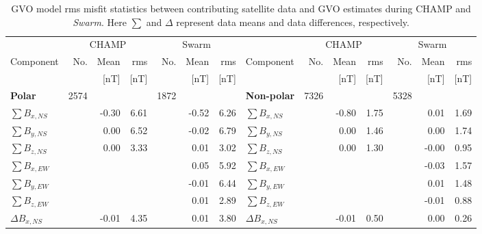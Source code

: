 \documentclass[extra,mreferee]{gji}
\begin{document}
\begin{table}
\caption{GVO model rms misfit statistics between contributing satellite data and GVO estimates  during CHAMP and \textit{Swarm}. Here {\scriptsize $\sum$} and $\Delta$ represent data means and data differences, respectively.}
\centering
{\small
\begin{tabular}{l r r r r r r | l r r r r r r}
\toprule
           & \multicolumn{3}{c}{CHAMP}  & \multicolumn{3}{c|}{Swarm} & & \multicolumn{3}{c}{CHAMP}  & \multicolumn{3}{c}{Swarm} \\
\cmidrule(lr){2-4} \cmidrule(lr){5-7} \cmidrule(lr){9-11} \cmidrule(lr){12-14}
 Component       & No.    & Mean  & rms  & No.  & Mean  & rms   &  Component          & No.  & Mean  & rms  & No. & Mean  & rms \\
                 &        &  [nT] & [nT] &      &  [nT] &  [nT] &                     &      &  [nT] &  [nT]&     &  [nT] &  [nT] \\
\midrule   
 \textbf{Polar}  & 2574   &       &      & 1872 &        &      & \textbf{Non-polar}& 7326   &       &      & 5328 &        &   \\
 $\sum B_{x,NS}$ &        & -0.30  & 6.61 &     & -0.52  & 6.26   & $\sum B_{x,NS}$ &        &-0.80  & 1.75 &      & 0.01   & 1.69  \\
 $\sum B_{y,NS}$ &        & 0.00  & 6.52 &      & -0.02  & 6.79   & $\sum B_{y,NS}$ &        & 0.00  & 1.46 &      & 0.00   & 1.74\\
 $\sum B_{z,NS}$ &        & 0.00  & 3.33 &      &  0.01  & 3.02   & $\sum B_{z,NS}$ &        & 0.00  & 1.30 &      & -0.00  & 0.95 \\
 $\sum B_{x,EW}$ &        &       &      &      & 0.05   & 5.92   & $\sum B_{x,EW}$ &        &       &      &      & -0.03  & 1.57\\
 $\sum B_{y,EW}$ &        &       &      &      &-0.01   & 6.44   & $\sum B_{y,EW}$ &        &       &      &      & 0.01   & 1.48\\
 $\sum B_{z,EW}$ &        &       &      &      & 0.01   & 2.89   & $\sum B_{z,EW}$ &        &       &      &      &-0.01   & 0.88\\                                             
 $\Delta B_{x,NS}$ &      & -0.01 & 4.35 &      & 0.01   & 3.80   & $\Delta B_{x,NS}$ &      & -0.01 & 0.50 &      & 0.00   & 0.26\\

\end{tabular}}
\end{table}
\end{document}
